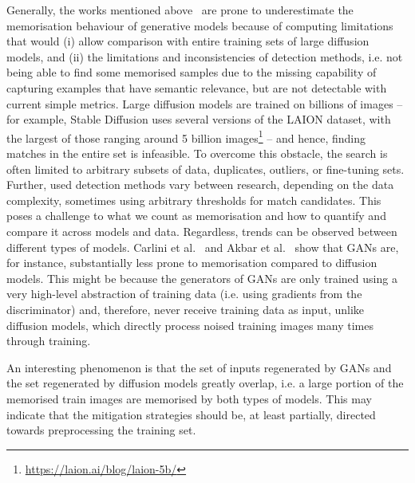 \documentclass[conference,table]{IEEEtran}
\begin{document}
Generally, the works mentioned above~\cite{somepalli_diffusion_2022, somepalli_understanding_2023, carlini_extracting_2023, carlini_extracting_2021} are prone to underestimate the memorisation behaviour of generative models because of computing limitations that would (i) allow comparison with entire training sets of large diffusion models, and (ii) the limitations and inconsistencies of detection methods, i.e. not being able to find some memorised samples due to the missing capability of capturing examples that have semantic relevance, but are not detectable with current simple metrics. 
Large diffusion models are trained on billions of images -- for example, Stable Diffusion uses several versions of the LAION dataset, with the largest of those ranging around 5 billion images\footnote{\url{https://laion.ai/blog/laion-5b/}} -- and hence, finding matches in the entire set is infeasible. To overcome this obstacle, the search is often limited to arbitrary subsets of data, duplicates, outliers, or fine-tuning sets. Further, used detection methods vary between research, depending on the data complexity, sometimes using arbitrary thresholds for match candidates. This poses a challenge to what we count as memorisation and how to quantify and compare it across models and data.
Regardless, trends can be observed between different types of models. Carlini et al.~\cite{carlini_extracting_2023} and Akbar et al.~\cite{akbar_beware_2023} show that GANs are, for instance, substantially less prone to memorisation compared to diffusion models.
This might be because the generators of GANs are only trained using a very high-level abstraction of training data (i.e. using gradients from the discriminator) and, therefore, never receive training data as input, unlike diffusion models, which directly process noised training images many times through training.

An interesting phenomenon is that the set of inputs regenerated by GANs and the set regenerated by diffusion models greatly overlap, i.e. a large portion of the memorised train images are memorised by both types of models. This may 
indicate that the mitigation strategies should be, at least partially, directed towards preprocessing the training set.
\end{document}
